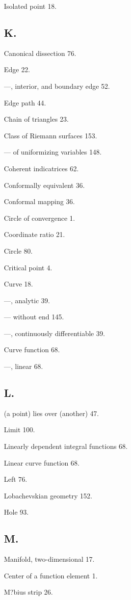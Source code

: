 \documentclass{article}
\begin{document}
Isolated point 18.

\subsection*{K.}

Canonical dissection 76.

Edge 22.

---, interior, and boundary edge 52.

Edge path 44.

Chain of triangles 23.

Class of Riemann surfaces 153.

--- of uniformizing variables 148.

Coherent indicatrices 62.

Conformally equivalent 36.

Conformal mapping 36.

Circle of convergence 1.

Coordinate ratio 21.

Circle 80.

Critical point 4.

Curve 18.

---, analytic 39.

--- without end 145.

---, continuously differentiable 39.

Curve function 68.

---, linear 68.

\subsection*{L.}

(a point) lies over (another) 47.

Limit 100.

Linearly dependent integral functions 68.

Linear curve function 68.

Left 76.

Lobachevskian geometry 152.

Hole 93.

\subsection*{M.}

Manifold, two-dimensional 17.

Center of a function element 1.

M?bius strip 26.
\end{document}
